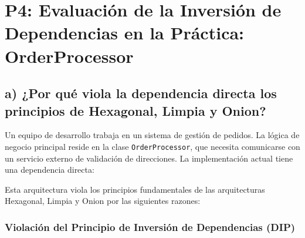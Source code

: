 
\chapter{P4: Evaluación de la Inversión de Dependencias en la Práctica: OrderProcessor}

\section{a) ¿Por qué viola la dependencia directa los principios de Hexagonal, Limpia y Onion?}

Un equipo de desarrollo trabaja en un sistema de gestión de pedidos. La lógica de negocio principal reside en la clase \texttt{OrderProcessor}, que necesita comunicarse con un servicio externo de validación de direcciones. La implementación actual tiene una dependencia directa:

\begin{center}
\end{center}

Esta arquitectura viola los principios fundamentales de las arquitecturas Hexagonal, Limpia y Onion por las siguientes razones:

\subsection*{Violación del Principio de Inversión de Dependencias (DIP)}

